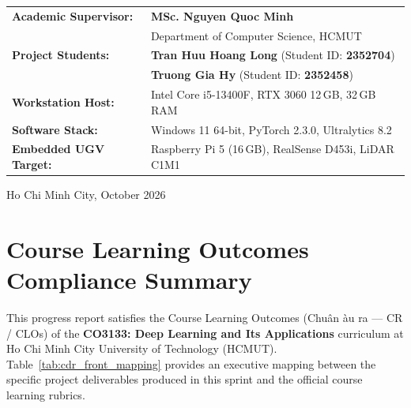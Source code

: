\documentclass[12pt,a4paper]{article}
\begin{document}
\begin{titlepage}
\vspace{1.2cm}
\begin{flushleft}
\large
\begin{tabular}{@{}ll@{}}
\textbf{Academic Supervisor:} & \textbf{MSc. Nguyen Quoc Minh} \\
                             & Department of Computer Science, HCMUT \\[0.3cm]
\textbf{Project Students:}    & \textbf{Tran Huu Hoang Long} \quad (Student ID: \textbf{2352704}) \\
                             & \textbf{Truong Gia Hy} \quad\quad\quad (Student ID: \textbf{2352458}) \\[0.3cm]
\textbf{Workstation Host:}   & Intel Core i5-13400F, RTX 3060 12\,GB, 32\,GB RAM \\
\textbf{Software Stack:}     & Windows 11 64-bit, PyTorch 2.3.0, Ultralytics 8.2 \\
\textbf{Embedded UGV Target:}& Raspberry Pi 5 (16\,GB), RealSense D453i, LiDAR C1M1 \\
\end{tabular}
\end{flushleft}

\vfill
{\large Ho Chi Minh City, October 2026\par}
\end{titlepage}
\hypersetup{pageanchor=true}

\newpage
{}

\section*{Course Learning Outcomes Compliance Summary}

This progress report satisfies the Course Learning Outcomes (Chu\^{a}n \dj\`{a}u ra --- C\DJ R / CLOs) of the \textbf{CO3133: Deep Learning and Its Applications} curriculum at Ho Chi Minh City University of Technology (HCMUT). Table~\ref{tab:cdr_front_mapping} provides an executive mapping between the specific project deliverables produced in this sprint and the official course learning rubrics.
\end{document}
